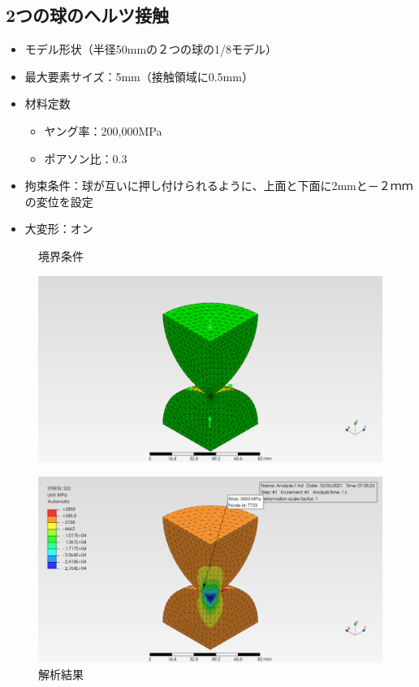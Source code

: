 \documentclass[a4j,20pt,slide]{ltjsarticle}
\begin{document}
\subsection{2つの球のヘルツ接触}
\begin{itemize}
	\item モデル形状（半径50mmの２つの球の1/8モデル）
	\item 最大要素サイズ：5mm（接触領域に0.5mm）
	\item 材料定数
	      \begin{itemize}
		      \item ヤング率：200,000MPa
		      \item ポアソン比：0.3
	      \end{itemize}
	\item 拘束条件：球が互いに押し付けられるように、上面と下面に2mmと－２ｍｍの変位を設定
	\item 大変形：オン
\end{itemize}
\vspace{-\baselineskip}
\begin{figure}[H]
	\begin{minipage}{.49\hsize}
		\caption{境界条件}
		\label{08-01}
		\centering
		\includegraphics[width=.95\columnwidth]{fig/08-01.png}
	\end{minipage}
	\begin{minipage}{.49\hsize}
		\caption{解析結果}
		\label{08-02}
		\centering
		\includegraphics[width=.95\columnwidth]{fig/08-02.png}
	\end{minipage}
\end{figure}
\clearpage
%
\end{document}
